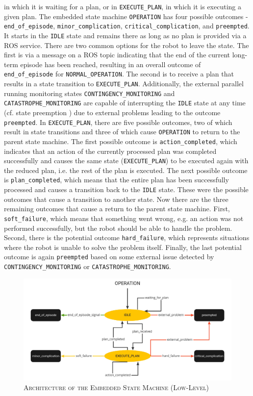\documentclass[english, master, utf8]{base/thesis_KBS}
\newcommand{\code}[1]{\colorbox{light-gray}{\texttt{#1}}}
\begin{document}
in which it is waiting for a plan, or in \code{EXECUTE\_PLAN}, in which it is executing a given plan. The embedded state machine \code{OPERATION} has 
four possible outcomes - \code{end\_of\_episode}, \code{minor\_complication}, \code{critical\_complication}, and \code{preempted}. 
It starts in the \code{IDLE} state and remains there as long as no plan is provided via a ROS service.
There are two common options for the robot to leave the state. The first is via a message on a ROS topic indicating that the end of the current long-term episode
has been reached, resulting in an overall outcome of \code{end\_of\_episode} for \code{NORMAL\_OPERATION}. The second is to receive a plan that results in a state
transition to \code{EXECUTE\_PLAN}. Additionally, the external parallel running monitoring states \code{CONTINGENCY\_MONITORING} and \code{CATASTROPHE\_MONITORING}
are capable of interrupting the \code{IDLE} state at any time (cf. state preemption \cite{state_preemption}) due to external problems leading to the outcome \code{preempted}.
In \code{EXECUTE\_PLAN}, there are five possible outcomes, two of which result in state transitions and three of which cause \code{OPERATION} 
to return to the parent state machine. The first possible outcome is \code{action\_completed}, which indicates that an action of the currently processed plan was 
completed successfully and causes the same state (\code{EXECUTE\_PLAN}) to be executed again with the reduced plan, i.e. the rest of the plan is executed.
The next possible outcome is \code{plan\_completed}, which means that the entire plan has been successfully processed and causes a transition back to the \code{IDLE} state.
These were the possible outcomes that cause a transition to another state. Now there are the three remaining outcomes that cause a return to the parent state machine. 
First, \code{soft\_failure}, which means that something went wrong, e.g. an action was not performed successfully, but the robot should be able to handle the problem. 
Second, there is the potential outcome \code{hard\_failure}, which represents situations where the robot is unable to solve the problem itself.
Finally, the last potential outcome is again \code{preempted} based on some external issue detected by \code{CONTINGENCY\_MONITORING} or \code{CATASTROPHE\_MONITORING}.
\begin{figure}[H]
    \centering
    \includegraphics[width=\textwidth]{pics/SMACH_low_level.jpg}
    \caption{\textsc{Architecture of the Embedded State Machine (Low-Level)}}
    \label{fig:low_level_smach}
\end{figure}
\end{document}
